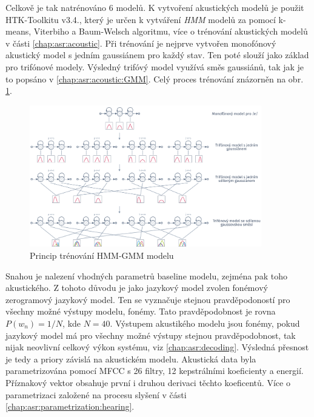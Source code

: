 
Celkově je tak natrénováno $6$ modelů. K vytvoření akustických modelů je použit HTK-Toolkitu v3.4., který je určen k vytváření \textit{HMM} modelů za pomocí k-means, Viterbiho a Baum-Welsch algoritmu, více o trénování akustických modelů v části \ref{chap:asr:acoustic}. Při trénování je nejprve vytvořen monofónový akustický model s jedním gaussiánem pro každý stav. Ten poté slouží jako základ pro trifónové modely. Výsledný trifóvý model využívá směs gaussiánů, tak jak je to popsáno v \ref{chap:asr:acoustic:GMM}. Celý proces trénování znázorněn na obr. \ref{fig:construction:results:baseline:hmm:training}.

\begin{figure}[hbpt]
  \centering
  \includegraphics[width=0.9\textwidth]{./ch5-construction/img/hmm-training.pdf}
  \caption{Princip trénování HMM-GMM modelu}
  \label{fig:construction:results:baseline:hmm:training}
\end{figure}

Snahou je nalezení vhodných parametrů baseline modelu, zejména pak toho akustického. Z tohoto důvodu je jako jazykový model zvolen fonémový zerogramový jazykový model. Ten se vyznačuje stejnou pravděpodoností pro všechny možné výstupy modelu, fonémy. Tato pravděpodobnost je rovna $P(w_n) = 1/N$, kde $N=40$. Výstupem akustikého modelu jsou fonémy, pokud jazykový model má pro všechny možné výstupy stejnou pravděpodobnost, tak nijak neovlivní celkový výkon systému, viz \ref{chap:asr:decoding}. Výsledná přesnost je tedy a priory závislá na akustickém modelu. Akustická data byla parametrizována pomocí MFCC s 26 filtry, 12 kepstrálními koeficienty a energií. Příznakový vektor obsahuje první i druhou derivaci těchto koeficentů. Více o parametrizaci založené na procesu slyšení v části \ref{chap:asr:parametrization:hearing}.


